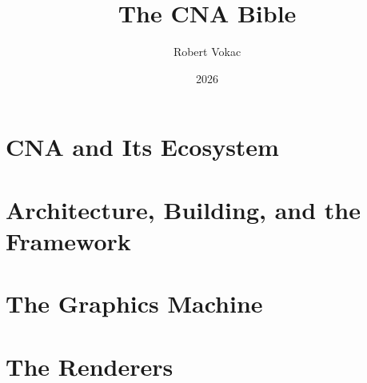 \documentclass[11pt,twoside,openright]{book}
\title{The CNA Bible}
\author{Robert Vokac}
\date{2026}
\begin{document}
\frontmatter




\tableofcontents

\mainmatter

\part{CNA and Its Ecosystem}
\label{part:ecosystem}




\part{Architecture, Building, and the Framework}
\label{part:architecture-framework}









\part{The Graphics Machine}
\label{part:graphics-machine}








\part{The Renderers}
\label{part:renderers}














\end{document}
